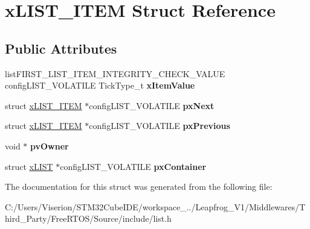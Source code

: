 \hypertarget{structx_l_i_s_t___i_t_e_m}{}\section{x\+L\+I\+S\+T\+\_\+\+I\+T\+EM Struct Reference}
\label{structx_l_i_s_t___i_t_e_m}
\subsection*{Public Attributes}
\begin{DoxyCompactItemize}
\item 
\mbox{\label{structx_l_i_s_t___i_t_e_m_a9b1f26de79f9da1403ca3ebc7a2e653a}} 
list\+F\+I\+R\+S\+T\+\_\+\+L\+I\+S\+T\+\_\+\+I\+T\+E\+M\+\_\+\+I\+N\+T\+E\+G\+R\+I\+T\+Y\+\_\+\+C\+H\+E\+C\+K\+\_\+\+V\+A\+L\+UE config\+L\+I\+S\+T\+\_\+\+V\+O\+L\+A\+T\+I\+LE Tick\+Type\+\_\+t {\bfseries x\+Item\+Value}
\item 
\mbox{\label{structx_l_i_s_t___i_t_e_m_a03713c4ee953ef5ca6adbec883720c60}} 
struct \mbox{\hyperlink{structx_l_i_s_t___i_t_e_m}{x\+L\+I\+S\+T\+\_\+\+I\+T\+EM}} $\ast$config\+L\+I\+S\+T\+\_\+\+V\+O\+L\+A\+T\+I\+LE {\bfseries px\+Next}
\item 
\mbox{\label{structx_l_i_s_t___i_t_e_m_ae8e553eae41010a8e41c66d76c94110b}} 
struct \mbox{\hyperlink{structx_l_i_s_t___i_t_e_m}{x\+L\+I\+S\+T\+\_\+\+I\+T\+EM}} $\ast$config\+L\+I\+S\+T\+\_\+\+V\+O\+L\+A\+T\+I\+LE {\bfseries px\+Previous}
\item 
\mbox{\label{structx_l_i_s_t___i_t_e_m_aeb3110b50fe0dbce826d929b27b5ddb1}} 
void $\ast$ {\bfseries pv\+Owner}
\item 
\mbox{\label{structx_l_i_s_t___i_t_e_m_afb1e27a88f6b064cd0216de08009844a}} 
struct \mbox{\hyperlink{structx_l_i_s_t}{x\+L\+I\+ST}} $\ast$config\+L\+I\+S\+T\+\_\+\+V\+O\+L\+A\+T\+I\+LE {\bfseries px\+Container}
\end{DoxyCompactItemize}


The documentation for this struct was generated from the following file\+:\begin{DoxyCompactItemize}
\item 
C\+:/\+Users/\+Viserion/\+S\+T\+M32\+Cube\+I\+D\+E/workspace\+\_../\+Leapfrog\+\_\+\+V1/\+Middlewares/\+Third\+\_\+\+Party/\+Free\+R\+T\+O\+S/\+Source/include/list.\+h\end{DoxyCompactItemize}
